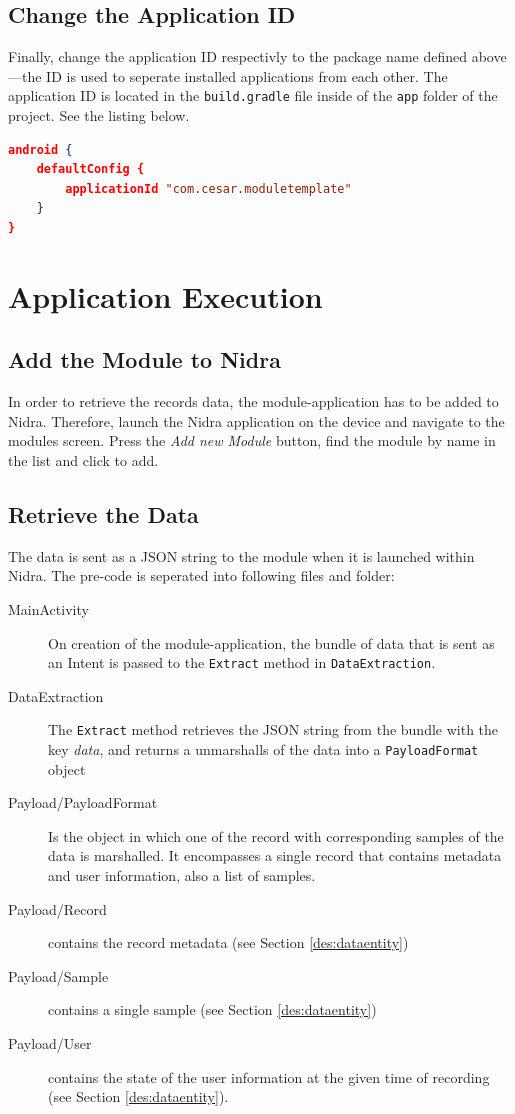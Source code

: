 \subsection{Change the Application ID}
Finally, change the application ID respectivly to the package name defined above---the ID is used to seperate installed applications from each other. The application ID is located in the \verb|build.gradle| file inside of the \verb|app| folder of the project. See the listing below.

\begin{lstlisting}[language=json, caption={}, captionpos=b]
android {
    defaultConfig {
        applicationId "com.cesar.moduletemplate"
    }
}
\end{lstlisting}

\section{Application Execution}


\subsection{Add the Module to Nidra}
In order to retrieve the records data, the module-application has to be added to Nidra. Therefore, launch the Nidra application on the device and navigate to the modules screen. Press the \textit{Add new Module} button, find the module by name in the list and click to add. 

\subsection{Retrieve the Data}
The data is sent as a JSON string to the module when it is launched within Nidra. The pre-code is seperated into following files and folder:

\begin{description}
    \item[MainActivity] On creation of the module-application, the bundle of data that is sent as an Intent is passed to the \verb|Extract| method in \verb|DataExtraction|.
    \item[DataExtraction] The \verb|Extract| method retrieves the JSON string from the bundle with the key \textit{data}, and returns a unmarshalls of the data into a \verb|PayloadFormat| object
    \item[Payload/PayloadFormat] Is the object in which one of the record with corresponding samples of the data is marshalled. It encompasses a single record that contains metadata and user information, also a list of samples. 
    \item[Payload/Record] contains the record metadata (see Section \ref{des:dataentity})
    \item[Payload/Sample] contains a single sample (see Section \ref{des:dataentity})
    \item[Payload/User] contains the state of the user information at the given time of recording (see Section \ref{des:dataentity}).
\end{description}

